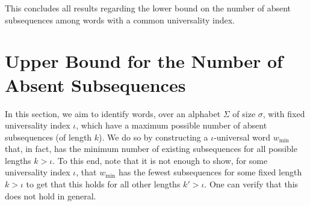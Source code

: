 \documentclass[10pt,a4paper]{amsart}
\newif\ifpaper
\theoremstyle{plain}
\theoremstyle{definition}
\begin{document}
This concludes all results regarding the lower bound on the number of absent subsequences among words with a common universality index.



	
	
	\section{Upper Bound for the Number of Absent Subsequences}\label{sec:upbound}
In this section, we aim to identify words, over an alphabet $\Sigma$ of size $\sigma$, with fixed universality index $\iota$, which have a maximum possible number of absent subsequences (of length $k$). We do so by constructing a $\iota$-universal word $w_{\min}$ that, in fact, has the minimum number of existing subsequences for all possible lengths $k>\iota$.
To this end, note that it is not enough to show, for some universality index $\iota$, that $w_{\min}$ has the fewest subsequences for some fixed length $k > \iota$ to get that this holds for all other lengths $k' > \iota$. One can verify that this does not hold in general. %
\ifpaper
\end{document}

